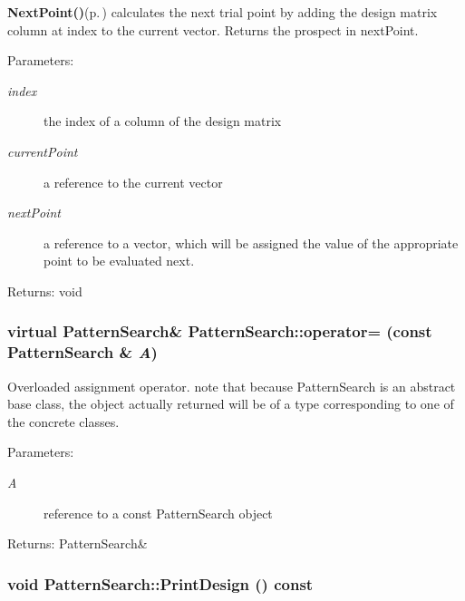 {\bf Next\-Point()}{\rm (p.\,\pageref{classPatternSearch_b3})} calculates the next trial point by adding the design matrix column at index to the current vector. Returns the prospect in next\-Point. \begin{Desc}
\item[Parameters:]
\begin{description}
\item[{\em index}]the index of a column of the design matrix \item[{\em current\-Point}]a reference to the current vector \item[{\em next\-Point}]a reference to a vector, which will be assigned the value of the appropriate point to be evaluated next. \end{description}
\end{Desc}
\begin{Desc}
\item[Returns:]void \end{Desc}
\subsubsection{\setlength{\rightskip}{0pt plus 5cm}virtual {\bf Pattern\-Search}\& Pattern\-Search::operator= (const {\bf Pattern\-Search} \& {\em A})\hspace{0.3cm}{\tt  [virtual]}}\label{classPatternSearch_z17_0}


Overloaded assignment operator. note that because Pattern\-Search is an abstract base class, the object actually returned will be of a type corresponding to one of the concrete classes. \begin{Desc}
\item[Parameters:]
\begin{description}
\item[{\em A}]reference to a const Pattern\-Search object \end{description}
\end{Desc}
\begin{Desc}
\item[Returns:]Pattern\-Search\& \end{Desc}
\subsubsection{\setlength{\rightskip}{0pt plus 5cm}void Pattern\-Search::Print\-Design () const}\label{classPatternSearch_z17_5}


